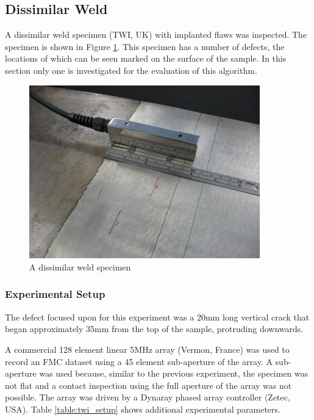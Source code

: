 \subsection{Dissimilar Weld}

A dissimilar weld specimen (TWI, UK) with implanted flaws was inspected. The specimen is shown in Figure \ref{fig:TWI1}. This specimen has a number of defects, the locations of which can be seen marked on the surface of the sample. In this section only one is investigated for the evaluation of this algorithm. 

\begin{figure}[h!]
\centering
		\includegraphics[width=100mm]{TWI1.png}
		\caption{A dissimilar weld specimen}
		\label{fig:TWI1}
\end{figure}

\subsubsection{Experimental Setup}

The defect focused upon for this experiment was a 20mm long vertical crack that began approximately 35mm from the top of the sample, protruding downwards.

A commercial 128 element linear 5MHz array (Vermon, France) was used to record an FMC dataset using a 45 element sub-aperture of the array. A sub-aperture was used because, similar to the previous experiment, the specimen was not flat and a contact inspection using the full aperture of the array was not possible. The array was driven by a Dynaray phased array controller (Zetec, USA). Table \ref{table:twi_setup} shows additional experimental parameters.

